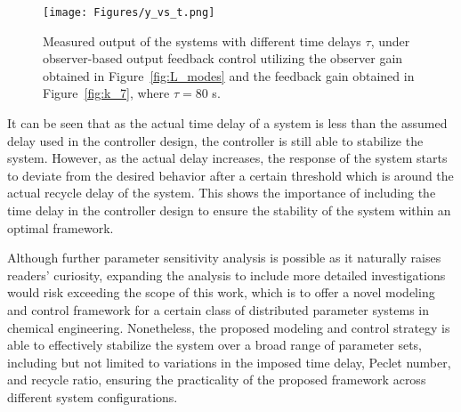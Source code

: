 \begin{figure}[!htbp]
    \centering
    \texttt{[image: Figures/y\_vs\_t.png]}
    \caption{Measured output of the systems with different time delays $\tau$, under observer-based output feedback control utilizing the observer gain obtained in Figure~\ref{fig:L_modes} and the feedback gain obtained in Figure~\ref{fig:k_7}, where $\tau = 80$ s.}
    \label{fig:tau_sensitivity}
\end{figure}

It can be seen that as the actual time delay of a system is less than the assumed delay used in the controller design, the controller is still able to stabilize the system. However, as the actual delay increases, the response of the system starts to deviate from the desired behavior after a certain threshold which is around the actual recycle delay of the system. This shows the importance of including the time delay in the controller design to ensure the stability of the system within an optimal framework.

Although further parameter sensitivity analysis is possible as it naturally raises readers' curiosity, expanding the analysis to include more detailed investigations would risk exceeding the scope of this work, which is to offer a novel modeling and control framework for a certain class of distributed parameter systems in chemical engineering. Nonetheless, the proposed modeling and control strategy is able to effectively stabilize the system over a broad range of parameter sets, including but not limited to variations in the imposed time delay, Peclet number, and recycle ratio, ensuring the practicality of the proposed framework across different system configurations.